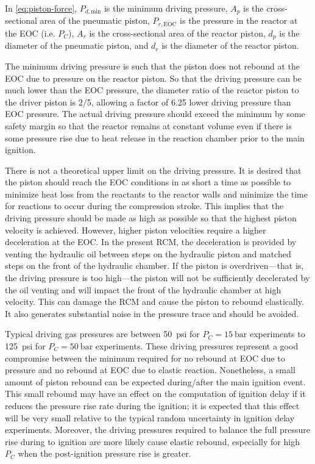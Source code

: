 \documentclass[../main.tex]{subfiles}
\begin{document}
In \cref{eq:piston-force}, $P_{d,\text{min}}$ is the minimum
driving pressure, $A_p$ is the cross-sectional area of the pneumatic piston,
$P_{r,\text{EOC}}$ is the pressure in the reactor at the EOC (i.e. $P_C$),
$A_r$ is the cross-sectional area of the reactor piston, $d_p$ is the diameter
of the pneumatic piston, and $d_r$ is the diameter of the reactor piston.

The minimum driving pressure is such that the piston does not rebound at
the EOC due to pressure on the reactor piston. So that the driving
pressure can be much lower than the EOC pressure, the diameter ratio of
the reactor piston to the driver piston is \num{2/5}, allowing a factor of
\num{6.25} lower driving pressure than EOC pressure. The actual driving
pressure should exceed the minimum by some safety margin so that the
reactor remains at constant volume even if there is some pressure rise
due to heat release in the reaction chamber prior to the main ignition.

There is not a theoretical upper limit on the driving pressure. It is desired that the piston should
reach the EOC conditions in as short a time as possible to minimize heat
loss from the reactants to the reactor walls and minimize the time for
reactions to occur during the compression stroke. This implies that the
driving pressure should be made as high as possible so that the highest
piston velocity is achieved. However, higher piston velocities require
a higher deceleration at the EOC. In the present RCM, the deceleration
is provided by venting the hydraulic oil between steps on the hydraulic
piston and matched steps on the front of the hydraulic chamber. If the
piston is overdriven---that is, the driving pressure is too high---the
piston will not be sufficiently decelerated by the oil venting and will
impact the front of the hydraulic chamber at high velocity. This can damage
the RCM and cause the piston to rebound elastically. It also generates
substantial noise in the pressure trace and should be avoided.

Typical driving gas pressures are between \SI{50}{psi} for $P_C = \SI{15}{\bar}$ experiments
to  \SI{125}{psi} for $P_C = \SI{50}{\bar}$ experiments. These driving pressures represent a
good compromise between the minimum required for no rebound at EOC due
to pressure and no rebound at EOC due to elastic reaction. Nonetheless,
a small amount of piston rebound can be expected during/after the
main ignition event. This small rebound may have an effect on the computation of
ignition delay if it reduces the pressure rise rate during the ignition;
it is expected that this effect will be very small relative to the
typical random uncertainty in ignition delay experiments. Moreover,
the driving pressures required to balance the full pressure rise during
to ignition are more likely cause elastic rebound,
especially for high $P_C$ when the post-ignition pressure rise is greater.
\end{document}

